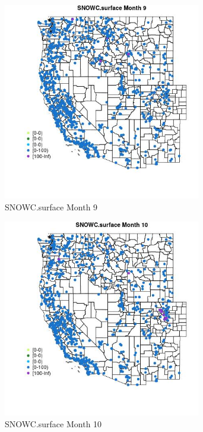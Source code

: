 \begin{figure} 
\centering  
\includegraphics[width=0.77\textwidth]{Code_Outputs/Report_ML_input_PM25_Step4_part_f_de_duplicated_aveswNAs_MapObsMo9SNOWCsurface.jpg} 
\caption{\label{fig:Report_ML_input_PM25_Step4_part_f_de_duplicated_aveswNAsMapObsMo9SNOWCsurface}SNOWC.surface Month 9} 
\end{figure} 
 

\begin{figure} 
\centering  
\includegraphics[width=0.77\textwidth]{Code_Outputs/Report_ML_input_PM25_Step4_part_f_de_duplicated_aveswNAs_MapObsMo10SNOWCsurface.jpg} 
\caption{\label{fig:Report_ML_input_PM25_Step4_part_f_de_duplicated_aveswNAsMapObsMo10SNOWCsurface}SNOWC.surface Month 10} 
\end{figure} 
 

